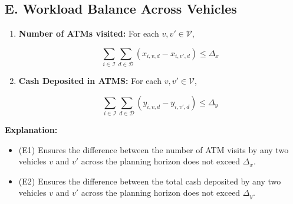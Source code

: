 \documentclass[11pt]{article}
\begin{document}
\subsection*{E. Workload Balance Across Vehicles}
\begin{enumerate}[label=\textbf{(E\arabic*)}]
    \item \textbf{Number of ATMs visited:} For each \(v,v' \in \mathcal{V}\),
    
    \[
    \sum_{i \in \mathcal{I}} \sum_{d \in \mathcal{D}} (x_{i,v,d} - x_{i,v',d}) \le \Delta_x
    \]
    \item \textbf{Cash Deposited in ATMS:} For each \(v,v' \in \mathcal{V}\),

    \[
        \sum_{i \in \mathcal{I}} \sum_{d \in \mathcal{D}} (y_{i,v,d} - y_{i,v',d}) \le \Delta_y
    \]
    
\end{enumerate}

\noindent \textbf{Explanation:}
\begin{itemize}[leftmargin=1cm]
    \item (E1) Ensures the difference between the number of ATM visits by any two vehicles \(v\) and \(v'\) across the planning horizon does not exceed \(\Delta_x\).
    \item (E2) Ensures the difference between the total cash deposited by any two vehicles \(v\) and \(v'\) across the planning horizon does not exceed \(\Delta_y\).
\end{itemize}
\end{document}

